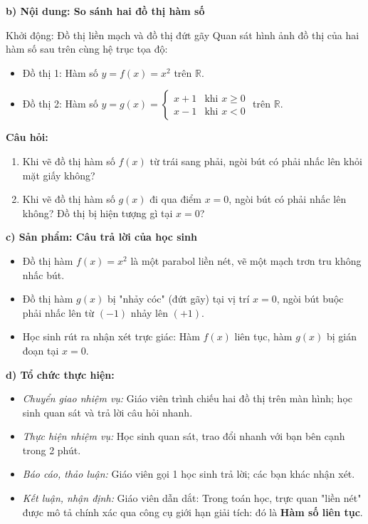 \documentclass[12pt, a4paper]{article}
\begin{document}
\noindent \textbf{b) Nội dung: So sánh hai đồ thị hàm số}
\begin{pedabox}{Khởi động: Đồ thị liền mạch và đồ thị đứt gãy}
Quan sát hình ảnh đồ thị của hai hàm số sau trên cùng hệ trục tọa độ:
\begin{itemize}[leftmargin=0.6cm]
    \item Đồ thị 1: Hàm số $y = f(x) = x^2$ trên $\mathbb{R}$.
    \item Đồ thị 2: Hàm số $y = g(x) = \begin{cases} x + 1 & \text{khi } x \ge 0 \\ x - 1 & \text{khi } x < 0 \end{cases}$ trên $\mathbb{R}$.
\end{itemize}
\textbf{Câu hỏi:}
\begin{enumerate}[leftmargin=0.6cm]
    \item Khi vẽ đồ thị hàm số $f(x)$ từ trái sang phải, ngòi bút có phải nhấc lên khỏi mặt giấy không?
    \item Khi vẽ đồ thị hàm số $g(x)$ đi qua điểm $x = 0$, ngòi bút có phải nhấc lên không? Đồ thị bị hiện tượng gì tại $x = 0$?
\end{enumerate}
\end{pedabox}

\noindent \textbf{c) Sản phẩm: Câu trả lời của học sinh}
\begin{itemize}[leftmargin=0.6cm]
    \item Đồ thị hàm $f(x) = x^2$ là một parabol liền nét, vẽ một mạch trơn tru không nhấc bút.
    \item Đồ thị hàm $g(x)$ bị "nhảy cóc" (đứt gãy) tại vị trí $x = 0$, ngòi bút buộc phải nhấc lên từ $(-1)$ nhảy lên $(+1)$.
    \item Học sinh rút ra nhận xét trực giác: Hàm $f(x)$ liên tục, hàm $g(x)$ bị gián đoạn tại $x = 0$.
\end{itemize}

\noindent \textbf{d) Tổ chức thực hiện:}
\begin{itemize}[leftmargin=0.8cm]
    \item \textit{Chuyển giao nhiệm vụ:} Giáo viên trình chiếu hai đồ thị trên màn hình; học sinh quan sát và trả lời câu hỏi nhanh.
    \item \textit{Thực hiện nhiệm vụ:} Học sinh quan sát, trao đổi nhanh với bạn bên cạnh trong 2 phút.
    \item \textit{Báo cáo, thảo luận:} Giáo viên gọi 1 học sinh trả lời; các bạn khác nhận xét.
    \item \textit{Kết luận, nhận định:} Giáo viên dẫn dắt: Trong toán học, trực quan "liền nét" được mô tả chính xác qua công cụ giới hạn giải tích: đó là \textbf{Hàm số liên tục}.
\end{itemize}
\end{document}
